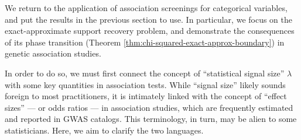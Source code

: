 
We return to the application of association screenings for categorical variables, and put the results in the previous section to use.
In particular, we focus on the exact-approximate support recovery problem, and demonstrate the consequences of its phase transition (Theorem \ref{thm:chi-squared-exact-approx-boundary}) in genetic association studies.

In order to do so, we must first connect the concept of   ``statistical signal size'' $\lambda$ with some key quantities in association tests.
While ``signal size'' likely sounds foreign to most practitioners, it is intimately linked with the concept of ``effect sizes'' --- or odds ratios --- in association studies, which are frequently estimated and reported in GWAS catalogs. This terminology, in turn, may be alien to some statisticians.  Here, we aim to clarify 
the two languages.




